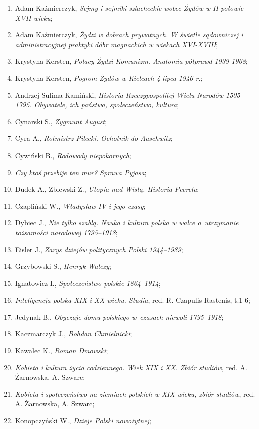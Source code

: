 \documentclass[a4paper,11pt]{article}
\begin{document}
\begin{enumerate}
\item Adam Kaźmierczyk, \emph{Sejmy i sejmiki szlacheckie wobec Żydów
    w II połowie XVII wieku};
\item Adam Kaźmierczyk, \emph{Żydzi w dobrach prywatnych. W świetle
    sądowniczej i administracyjnej praktyki dóbr magnackich w wiekach
    XVI-XVIII};
\item Krystyna Kersten, \emph{Polacy-Żydzi-Komunizm. Anatomia półprawd
    1939-1968};
\item Krystyna Kersten, \emph{Pogrom Żydów w Kielcach 4 lipca 1946
    r.};
\item Andrzej Sulima Kamiński, \emph{Historia Rzeczypospolitej Wielu
    Narodów 1505-1795. Obywatele, ich państwa, społeczeństwo,
    kultura};
\item Cynarski S., \emph{Zygmunt August};
\item Cyra A., \emph{Rotmistrz Pilecki. Ochotnik do Auschwitz};
\item Cywiński B., \emph{Rodowody niepokornych};
\item \emph{Czy ktoś przebije ten mur? Sprawa Pyjasa};
\item Dudek A., Zblewski Z., \emph{Utopia nad Wisłą. Historia
    Peerelu};
\item Czapliński W., \emph{Władysław IV i jego czasy};
\item Dybiec J., \emph{Nie tylko szablą. Nauka i kultura polska w
    walce o~utrzymanie tożsamości narodowej 1795--1918};
\item Eisler J., \emph{Zarys dziejów politycznych Polski 1944--1989};
\item Grzybowski S., \emph{Henryk Walezy};
\item Ignatowicz I., \emph{Społeczeństwo polskie 1864--1914};
\item \emph{Inteligencja polska XIX i XX wieku. Studia}, red. R.
  Czapulis-Rastenis, t.1-6;
\item Jedynak B., \emph{Obyczaje domu polskiego w~czasach niewoli
    1795--1918};
\item Kaczmarczyk J., \emph{Bohdan Chmielnicki};
\item Kawalec K., \emph{Roman Dmowski};
\item \emph{Kobieta i kultura życia codziennego. Wiek XIX i XX. Zbiór
    studiów}, red. A. Żarnowska, A. Szwarc;
\item \emph{Kobieta i społeczeństwo na ziemiach polskich w XIX wieku,
    zbiór studiów}, red. A. Żarnowska, A. Szwarc;
\item Konopczyński W., \emph{Dzieje Polski nowożytnej};

\end{enumerate}
\end{document}
